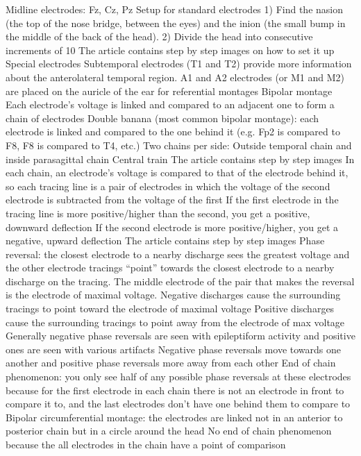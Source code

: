 \documentclass{article}
\begin{document}
Midline electrodes: Fz, Cz, Pz
Setup for standard electrodes
1) Find the nasion (the top of the nose bridge, between the eyes) and the inion (the small bump in the middle of the back of the head).
2) Divide the head into consecutive increments of 10%
The article contains step by step images on how to set it up 
Special electrodes
Subtemporal electrodes (T1 and T2) provide more information about the anterolateral temporal region.
A1 and A2 electrodes (or M1 and M2) are placed on the auricle of the ear for referential montages
Bipolar montage 
Each electrode’s voltage is linked and compared to an adjacent one to form a chain of electrodes
Double banana (most common bipolar montage): each electrode is linked and compared to the one behind it (e.g. Fp2 is compared to F8, F8 is compared to T4, etc.) 
Two chains per side: Outside temporal chain and inside parasagittal chain 
Central train 
The article contains step by step images 
In each chain, an electrode’s voltage is compared to that of the electrode behind it, so each tracing line is a pair of electrodes in which the voltage of the second electrode is subtracted from the voltage of the first 
If the first electrode in the tracing line is more positive/higher than the second, you get a positive, downward deflection
If the second electrode is more positive/higher, you get a negative, upward deflection
The article contains step by step images 
Phase reversal: the closest electrode to a nearby discharge sees the greatest voltage and the other electrode tracings “point” towards the closest electrode to a nearby discharge on the tracing.
The middle electrode of the pair that makes the reversal is the electrode of maximal voltage.
Negative discharges cause the surrounding tracings to point toward the electrode of maximal voltage
Positive discharges cause the surrounding tracings to point away from the electrode of max voltage 
Generally negative phase reversals are seen with epileptiform activity and positive ones are seen with various artifacts
Negative phase reversals move towards one another and positive phase reversals more away from each other
End of chain phenomenon: you only see half of any possible phase reversals at these electrodes because for the first electrode in each chain there is not an electrode in front to compare it to, and the last electrodes don’t have one behind them to compare to
Bipolar circumferential montage: the electrodes are linked not in an anterior to posterior chain but in a circle around the head
No end of chain phenomenon because the all electrodes in the chain have a point of comparison 
\end{document}
